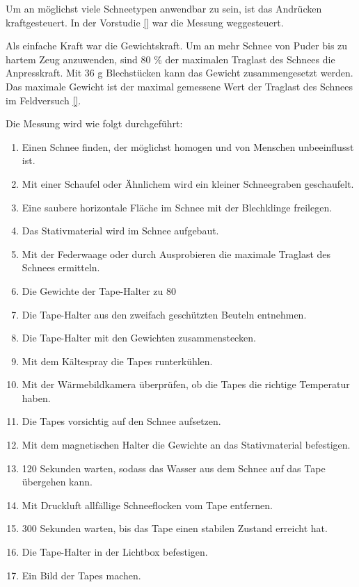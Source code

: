 

Um an möglichst viele Schneetypen anwendbar zu sein, ist das Andrücken kraftgesteuert. In der Vorstudie \ref{} war die Messung weggesteuert.

Als einfache Kraft war die Gewichtskraft. Um an mehr Schnee von Puder bis zu hartem Zeug anzuwenden, sind 80 \% der maximalen Traglast des Schnees die Anpresskraft. Mit 36 g Blechstücken kann das Gewicht zusammengesetzt werden. Das maximale Gewicht ist der maximal gemessene Wert der Traglast des Schnees im Feldversuch \ref{}.

Die Messung wird wie folgt durchgeführt:

\begin{enumerate}
\item Einen Schnee finden, der möglichst homogen und von Menschen unbeeinflusst ist.
\item Mit einer Schaufel oder Ähnlichem wird ein kleiner Schneegraben geschaufelt.
\item Eine saubere horizontale Fläche im Schnee mit der Blechklinge freilegen.
\item Das Stativmaterial wird im Schnee aufgebaut.
\item Mit der Federwaage oder durch Ausprobieren die maximale Traglast des Schnees ermitteln.
\item Die Gewichte der Tape-Halter zu 80 %
\item Die Tape-Halter aus den zweifach geschützten Beuteln entnehmen.
\item Die Tape-Halter mit den Gewichten zusammenstecken.
\item Mit dem Kältespray die Tapes runterkühlen.
\item Mit der Wärmebildkamera überprüfen, ob die Tapes die richtige Temperatur haben.
\item Die Tapes vorsichtig auf den Schnee aufsetzen.
\item Mit dem magnetischen Halter die Gewichte an das Stativmaterial befestigen.
\item 120 Sekunden warten, sodass das Wasser aus dem Schnee auf das Tape übergehen kann.
\item Mit Druckluft allfällige Schneeflocken vom Tape entfernen.
\item 300 Sekunden warten, bis das Tape einen stabilen Zustand erreicht hat.
\item Die Tape-Halter in der Lichtbox befestigen.
\item Ein Bild der Tapes machen.
\end{enumerate}
